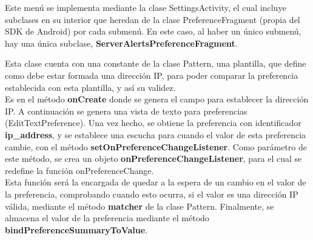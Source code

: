         Este menú se implementa mediante la clase SettingsActivity, el cual incluye subclases en su interior que heredan de la clase PreferenceFragment (propia del SDK de Android) por cada submenú. En este caso, al haber un único submenú, hay una única subclase, \textbf{ServerAlertsPreferenceFragment}. \\


        Esta clase cuenta con una constante de la clase Pattern, una plantilla, que define como debe estar formada una dirección IP, para poder comparar la preferencia establecida con esta plantilla, y así su validez. \\

        Es en el método \textbf{onCreate} donde se genera el campo para establecer la dirección IP. A continuación se genera una vista de texto para preferencias (EditTextPreference). Una vez hecho, se obtiene la preferencia con identificador \textbf{ip\_address}, y se establece una escucha para cuando el valor de esta preferencia cambie, con el método \textbf{setOnPreferenceChangeListener}. Como parámetro de este método, se crea un objeto \textbf{onPreferenceChangeListener}, para el cual se redefine la función onPreferenceChange. \\

        Esta función será la encargada de quedar a la espera de un cambio en el valor de la preferencia, comprobando cuando esto ocurra, si el valor es una dirección IP válida, mediante el método \textbf{matcher} de la clase Pattern. Finalmente, se almacena el valor de la preferencia mediante el método \textbf{bindPreferenceSummaryToValue}.
